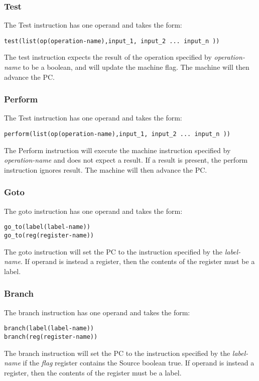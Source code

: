 \subsubsection{Test}
The Test instruction has one operand and takes the form:
\begin{lstlisting}
test(list(op(operation-name),input_1, input_2 ... input_n ))
\end{lstlisting}
The test instruction expects the result of the operation specified by \textit{operation-name} to be a boolean, and will update the machine flag. The machine will then advance the PC.

\subsubsection{Perform}
The Test instruction has one operand and takes the form:
\begin{lstlisting}
perform(list(op(operation-name),input_1, input_2 ... input_n ))
\end{lstlisting}
The Perform instruction will execute the machine instruction specified by \textit{operation-name} and does not expect a result. If a result is present, the perform instruction ignores result. The machine will then advance the PC. 

\subsubsection{Goto}
The goto instruction has one operand and takes the form:
\begin{lstlisting}
go_to(label(label-name))
go_to(reg(register-name))
\end{lstlisting}
The goto instruction will set the PC to the instruction specified by the \textit{label-name}. If operand is instead a register, then the contents of the register must be a label.

\subsubsection{Branch}
The branch instruction has one operand and takes the form:
\begin{lstlisting}
branch(label(label-name))
branch(reg(register-name))
\end{lstlisting}
The branch instruction will set the PC to the instruction specified by the \textit{label-name} if the \textit{flag} register contains the Source boolean true. If operand is instead a register, then the contents of the register must be a label.

